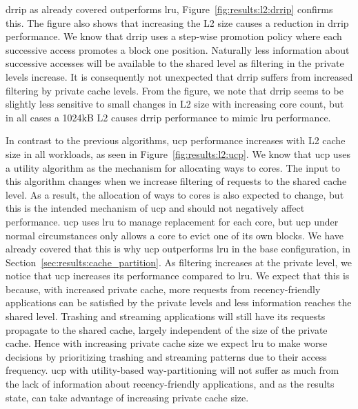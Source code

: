 \gls{drrip} as already covered outperforms \gls{lru}, Figure~\ref{fig:results:l2:drrip} confirms this.
The figure also shows that increasing the L2 size causes a reduction in \gls{drrip} performance.
We know that \gls{drrip} uses a step-wise promotion policy where each successive access promotes a block one position.
Naturally less information about successive accesses will be available to the shared level as filtering in the private levels increase.
It is consequently not unexpected that \gls{drrip} suffers from increased filtering by private cache levels.
From the figure, we note that \gls{drrip} seems to be slightly less sensitive to small changes in L2 size with increasing core count, but in all cases a 1024kB L2 causes \gls{drrip} performance to mimic \gls{lru} performance.

In contrast to the previous algorithms, \gls{ucp} performance increases with L2 cache size in all workloads, as seen in Figure~\ref{fig:results:l2:ucp}.
We know that \gls{ucp} uses a utility algorithm as the mechanism for allocating ways to cores. 
The input to this algorithm changes when we increase filtering of requests to the shared cache level.
As a result, the allocation of ways to cores is also expected to change, but this is the intended mechanism of \gls{ucp} and should not negatively affect performance.
\gls{ucp} uses \gls{lru} to manage replacement for each core, but \gls{ucp} under normal circumstances only allows a core to evict one of its own blocks. 
We have already covered that this is why \gls{ucp} outperforms \gls{lru} in the base configuration, in Section~\ref{sec:results:cache_partition}. 
As filtering increases at the private level, we notice that \gls{ucp} increases its performance compared to \gls{lru}. 
We expect that this is because, with increased private cache, more requests from recency-friendly applications can be satisfied by the private levels and less information reaches the shared level.
Trashing and streaming applications will still have its requests propagate to the shared cache, largely independent of the size of the private cache. 
Hence with increasing private cache size we expect \gls{lru} to make worse decisions by prioritizing trashing and streaming patterns due to their access frequency.
\gls{ucp} with utility-based way-partitioning will not suffer as much from the lack of information about recency-friendly applications, and as the results state, can take advantage of increasing private cache size.

